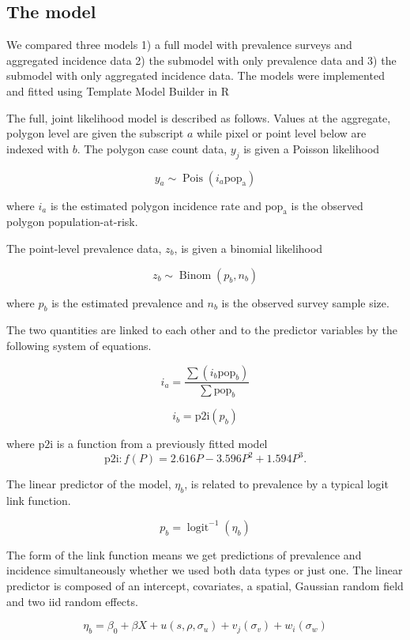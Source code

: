 \documentclass[10pt,letterpaper]{article}
\begin{document}
\subsection*{The model}

We compared three models 1) a full model with prevalence surveys and aggregated incidence data 2) the submodel with only prevalence data and 3) the submodel with only aggregated incidence data. 
The models were implemented and fitted using Template Model Builder \cite{TMB} in R \cite{R}

The full, joint likelihood model is described as follows. 
Values at the aggregate, polygon level are given the subscript $a$ while pixel or point level below are indexed with $b$.
The polygon case count data, $y_j$ is given a Poisson likelihood

$$y_a \sim \operatorname{Pois}(i_a\mathrm{pop_a})$$

where $i_a$ is the estimated polygon incidence rate and $\mathrm{pop_a}$ is the observed polygon population-at-risk.

The point-level prevalence data, $z_b$, is given a binomial likelihood

$$z_b \sim \operatorname{Binom}(p_b, n_b) $$

where $p_b$ is the estimated prevalence and $n_b$ is the observed survey sample size. 

The two quantities are linked to each other and to the predictor variables by the following system of equations.

$$i_a = \frac{ \sum(i_b \mathrm{pop}_b)}{\sum  \mathrm{pop}_b} $$

$$i_b = \mathrm{p2i}(p_b)$$

where $\mathrm{p2i}$ is a function from a previously fitted model \cite{cameron2015defining} 
$$\mathrm{p2i}: f\left(P\right) = 2.616P - 3.596P^2 + 1.594P^3.$$

The linear predictor of the model, $\eta_b$, is related to prevalence by a typical logit link function.

$$p_b = \operatorname{logit}^{-1}(\eta_b)$$


The form of the link function means we get predictions of prevalence and incidence simultaneously whether we used both data types or just one.
The linear predictor is composed of an intercept, covariates, a spatial, Gaussian random field and two iid random effects.

$$\eta_b = \beta_0 + \beta X  + u(s, \rho, \sigma_u) + v_j(\sigma_v) + w_i(\sigma_w)$$
\end{document}
